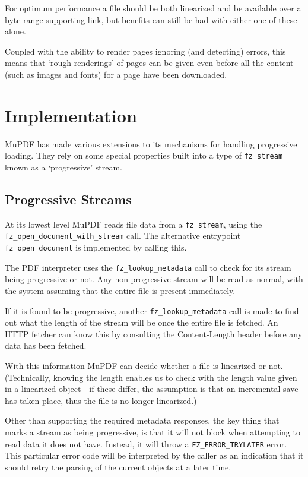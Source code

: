 \documentclass[oneside]{book}
\begin{document}
For optimum performance a file should be both linearized and be
available over a byte-range supporting link, but benefits can still
be had with either one of these alone.

Coupled with the ability to render pages ignoring (and detecting) errors, this means that `rough renderings' of pages can be given even before all the content (such as images and fonts) for a page have been downloaded.

\section{Implementation}

MuPDF has made various extensions to its mechanisms for handling
progressive loading. They rely on some special properties built into a type of \texttt{fz\_stream} known as a `progressive' stream.

\subsection{Progressive Streams}

At its lowest level MuPDF reads file data from a \texttt{fz\_stream}, using the \texttt{fz\_open\_document\_with\_stream} call. The alternative entrypoint \texttt{fz\_open\_document} is implemented by calling this.

The PDF interpreter uses the \texttt{fz\_lookup\_metadata} call to check for its stream being progressive or not. Any non-progressive stream will be read as normal, with the system assuming that the entire file is present immediately.

If it is found to be progressive, another \texttt{fz\_lookup\_metadata} call is made to find out what the length of the stream will be once the  entire file is fetched. An HTTP fetcher can know this by consulting the Content-Length header before any data has been fetched.

With this information MuPDF can decide whether a file is linearized or not. (Technically, knowing the length enables us to check with the length value given in a linearized object - if these differ, the assumption is that an incremental save has taken place, thus the file is no longer linearized.)

Other than supporting the required metadata responses, the key thing that marks a stream as being progressive, is that it will not block when attempting to read data it does not have. Instead, it will throw a \texttt{FZ\_ERROR\_TRYLATER} error. This particular error code will be interpreted by the caller as an indication that it should retry the parsing of the current objects at a later time.
\end{document}
